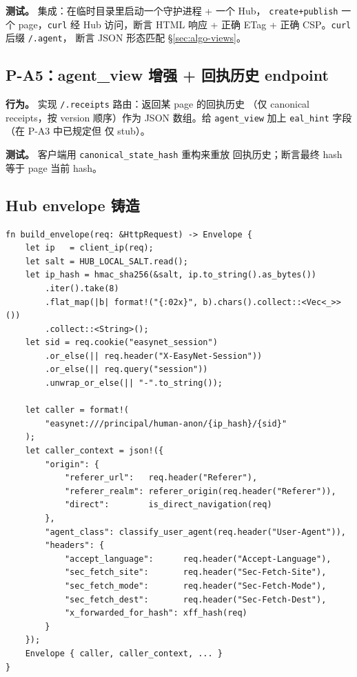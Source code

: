 \documentclass[11pt,a4paper]{article}
\theoremstyle{definition}
\begin{document}
\textbf{测试。} 集成：在临时目录里启动一个守护进程 + 一个 Hub，
\texttt{create+publish} 一个 page，\texttt{curl} 经 Hub 访问，断言
HTML 响应 + 正确 ETag + 正确 CSP。\texttt{curl} 后缀 \texttt{/.agent}，
断言 JSON 形态匹配 \S\ref{sec:algo-views}。

\subsection{P-A5：agent\_view 增强 + 回执历史 endpoint}

\textbf{行为。} 实现 \texttt{/.receipts} 路由：返回某 page 的回执历史
（仅 canonical receipts，按 version 顺序）作为 JSON 数组。给
\texttt{agent\_view} 加上 \texttt{eal\_hint} 字段（在 P-A3 中已规定但
仅 stub）。

\textbf{测试。} 客户端用 \texttt{canonical\_state\_hash} 重构来重放
回执历史；断言最终 hash 等于 page 当前 hash。

\subsection{Hub envelope 铸造}
\label{sec:hub}

\begin{lstlisting}
fn build_envelope(req: &HttpRequest) -> Envelope {
    let ip   = client_ip(req);
    let salt = HUB_LOCAL_SALT.read();
    let ip_hash = hmac_sha256(&salt, ip.to_string().as_bytes())
        .iter().take(8)
        .flat_map(|b| format!("{:02x}", b).chars().collect::<Vec<_>>())
        .collect::<String>();
    let sid = req.cookie("easynet_session")
        .or_else(|| req.header("X-EasyNet-Session"))
        .or_else(|| req.query("session"))
        .unwrap_or_else(|| "-".to_string());

    let caller = format!(
        "easynet:///principal/human-anon/{ip_hash}/{sid}"
    );
    let caller_context = json!({
        "origin": {
            "referer_url":   req.header("Referer"),
            "referer_realm": referer_origin(req.header("Referer")),
            "direct":        is_direct_navigation(req)
        },
        "agent_class": classify_user_agent(req.header("User-Agent")),
        "headers": {
            "accept_language":      req.header("Accept-Language"),
            "sec_fetch_site":       req.header("Sec-Fetch-Site"),
            "sec_fetch_mode":       req.header("Sec-Fetch-Mode"),
            "sec_fetch_dest":       req.header("Sec-Fetch-Dest"),
            "x_forwarded_for_hash": xff_hash(req)
        }
    });
    Envelope { caller, caller_context, ... }
}
\end{lstlisting}
\end{document}
